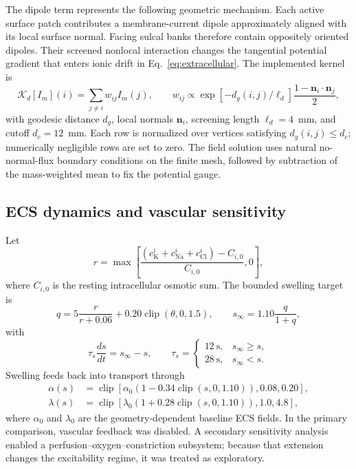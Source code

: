 \documentclass[12pt]{article}
\begin{document}
The dipole term represents the following geometric mechanism. Each active surface patch contributes a membrane-current dipole approximately aligned with its local surface normal. Facing sulcal banks therefore contain oppositely oriented dipoles. Their screened nonlocal interaction changes the tangential potential gradient that enters ionic drift in Eq.~\eqref{eq:extracellular}. The implemented kernel is
\begin{equation}
\mathcal K_d[I_m](i)=\sum_{j\ne i}w_{ij}I_m(j),
\qquad
w_{ij}\propto
\exp[-d_g(i,j)/\ell_d]
\frac{1-\mathbf n_i\cdot\mathbf n_j}{2},
\end{equation}
with geodesic distance $d_g$, local normals $\mathbf n_i$, screening length $\ell_d=4$~mm, and cutoff $d_c=12$~mm. Each row is normalized over vertices satisfying $d_g(i,j)\le d_c$; numerically negligible rows are set to zero. The field solution uses natural no-normal-flux boundary conditions on the finite mesh, followed by subtraction of the mass-weighted mean to fix the potential gauge.

\subsection{ECS dynamics and vascular sensitivity}

Let
\begin{equation}
r=\max\!\left[
\frac{(c_{\mathrm K}^{i}+c_{\mathrm{Na}}^{i}+c_{\mathrm{Cl}}^{i})-C_{i,0}}
{C_{i,0}},0\right],
\end{equation}
where $C_{i,0}$ is the resting intracellular osmotic sum. The bounded swelling target is
\begin{equation}
q=5\frac{r}{r+0.06}+0.20\operatorname{clip}(\theta,0,1.5),
\qquad
s_{\infty}=1.10\frac{q}{1+q},
\end{equation}
with
\begin{equation}
\tau_s\frac{ds}{dt}=s_{\infty}-s,
\qquad
\tau_s=
\begin{cases}
12\ \mathrm{s}, & s_{\infty}\ge s,\\
28\ \mathrm{s}, & s_{\infty}<s.
\end{cases}
\end{equation}
Swelling feeds back into transport through
\begin{align}
\alpha(s)&=\operatorname{clip}\!\left[\alpha_0(1-0.34\operatorname{clip}(s,0,1.10)),0.08,0.20\right],\\
\lambda(s)&=\operatorname{clip}\!\left[\lambda_0(1+0.28\operatorname{clip}(s,0,1.10)),1.0,4.8\right],
\end{align}
where $\alpha_0$ and $\lambda_0$ are the geometry-dependent baseline ECS fields. In the primary comparison, vascular feedback was disabled. A secondary sensitivity analysis enabled a perfusion--oxygen--constriction subsystem; because that extension changes the excitability regime, it was treated as exploratory.
\end{document}
